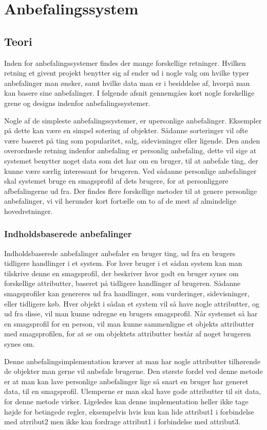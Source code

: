 \section{Anbefalingssystem}\label{anbefaling}

\subsection{Teori}
Inden for anbefalingssystemer findes der mange forskellige retninger.
Hvilken retning et givent projekt benytter sig af ender ud i nogle valg om hvilke typer anbefalinger man ønsker, samt hvilke data man er i besiddelse af, hvorpå man kan basere sine anbefalinger.
I følgende afsnit gennemgåes kort nogle forskellige grene og designs indenfor anbefalingssystemer.

Nogle af de simpleste anbefalingssystemer, er upersonlige anbefalinger.
Eksempler på dette kan være en simpel sotering af objekter.
Sådanne sorteringer vil ofte være baseret på ting som popularitet, salg, sidevisninger eller ligende.
Den anden overordnede retning indenfor anbefaling er personlig anbefaling, dette vil sige at systemet benytter noget data som det har om en bruger, til at anbefale ting, der kunne være særlig interessant for brugeren.
Ved sådanne personlige anbefalinger skal systemet bruge en smagsprofil af dets brugere, for at personliggøre afbefalingerne ud fra.
Der findes flere forskellige metoder til at genere personlige anbefalinger, vi vil herunder kort fortælle om to af de mest af almindelige hovedretninger\citep{RecommenderSystems}.

\subsubsection{Indholdsbaserede anbefalinger}
Indholdsbaserede anbefalinger anbefaler en bruger ting, ud fra en brugers tidligere handlinger i et system.
For hver bruger i et sådan system kan man tilskrive denne en smagsprofil, der beskriver hvor godt en bruger synes om forskellige attributter, baseret på tidligere handlinger af brugeren.
Sådanne smagsprofiler kan genereres ud fra handlinger, som vurderinger, sidevisninger, eller tidligere køb.
Hver objekt i sådan et system vil så have nogle attributter, og ud fra disse, vil man kunne udregne en brugers smagsprofil.
Når systemet så har en smagsprofil for en person, vil man kunne sammenligne et objekts attributter med smagsprofilen, for at se om objektets attributter består af noget brugeren synes om.

Denne anbefalingsimplementation kræver at man har nogle attributter tilhørende de objekter man gerne vil anbefale brugerne.
Den største fordel ved denne metode  er at man kan lave personlige anbefalinger lige så snart en bruger har generet data, til en smagsprofil.
Ulemperne er man skal have gode attributter til sit data, for denne metode virker. Ligeledes kan denne implementation heller ikke tage højde for betingede regler, eksempelvis hvis kun kan lide attribut1 i forbindelse med atrribut2 men ikke kan fordrage attribut1 i forbindelse med attribut3.


